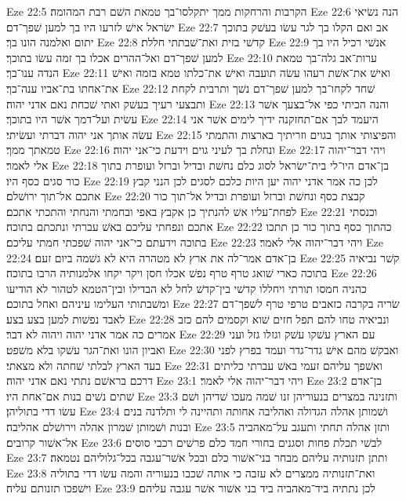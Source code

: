 Eze 22:5  הקרבות והרחקות ממך יתקלסו־בך טמאת השׁם רבת המהומה׃
Eze 22:6  הנה נשׂיאי ישׂראל אישׁ לזרעו היו בך למען שׁפך־דם׃
Eze 22:7  אב ואם הקלו בך לגר עשׂו בעשׁק בתוכך יתום ואלמנה הונו בך׃
Eze 22:8  קדשׁי בזית ואת־שׁבתתי חללת׃
Eze 22:9  אנשׁי רכיל היו בך למען שׁפך־דם ואל־ההרים אכלו בך זמה עשׂו בתוכך׃
Eze 22:10  ערות־אב גלה־בך טמאת הנדה ענו־בך׃
Eze 22:11  ואישׁ את־אשׁת רעהו עשׂה תועבה ואישׁ את־כלתו טמא בזמה ואישׁ את־אחתו בת־אביו ענה־בך׃
Eze 22:12  שׁחד לקחו־בך למען שׁפך־דם נשׁך ותרבית לקחת ותבצעי רעיך בעשׁק ואתי שׁכחת נאם אדני יהוה׃
Eze 22:13  והנה הכיתי כפי אל־בצעך אשׁר עשׂית ועל־דמך אשׁר היו בתוכך׃
Eze 22:14  היעמד לבך אם־תחזקנה ידיך לימים אשׁר אני עשׂה אותך אני יהוה דברתי ועשׂיתי׃
Eze 22:15  והפיצותי אותך בגוים וזריתיך בארצות והתמתי טמאתך ממך׃
Eze 22:16  ונחלת בך לעיני גוים וידעת כי־אני יהוה׃
Eze 22:17  ויהי דבר־יהוה אלי לאמר׃
Eze 22:18  בן־אדם היו־לי בית־ישׂראל לסוג כלם נחשׁת ובדיל וברזל ועופרת בתוך כור סגים כסף היו׃
Eze 22:19  לכן כה אמר אדני יהוה יען היות כלכם לסגים לכן הנני קבץ אתכם אל־תוך ירושׁלם׃
Eze 22:20  קבצת כסף ונחשׁת וברזל ועופרת ובדיל אל־תוך כור לפחת־עליו אשׁ להנתיך כן אקבץ באפי ובחמתי והנחתי והתכתי אתכם׃
Eze 22:21  וכנסתי אתכם ונפחתי עליכם באשׁ עברתי ונתכתם בתוכה׃
Eze 22:22  כהתוך כסף בתוך כור כן תתכו בתוכה וידעתם כי־אני יהוה שׁפכתי חמתי עליכם׃
Eze 22:23  ויהי דבר־יהוה אלי לאמר׃
Eze 22:24  בן־אדם אמר־לה את ארץ לא מטהרה היא לא גשׁמה ביום זעם׃
Eze 22:25  קשׁר נביאיה בתוכה כארי שׁואג טרף טרף נפשׁ אכלו חסן ויקר יקחו אלמנותיה הרבו בתוכה׃
Eze 22:26  כהניה חמסו תורתי ויחללו קדשׁי בין־קדשׁ לחל לא הבדילו ובין־הטמא לטהור לא הודיעו ומשׁבתותי העלימו עיניהם ואחל בתוכם׃
Eze 22:27  שׂריה בקרבה כזאבים טרפי טרף לשׁפך־דם לאבד נפשׁות למען בצע בצע׃
Eze 22:28  ונביאיה טחו להם תפל חזים שׁוא וקסמים להם כזב אמרים כה אמר אדני יהוה ויהוה לא דבר׃
Eze 22:29  עם הארץ עשׁקו עשׁק וגזלו גזל ועני ואביון הונו ואת־הגר עשׁקו בלא משׁפט׃
Eze 22:30  ואבקשׁ מהם אישׁ גדר־גדר ועמד בפרץ לפני בעד הארץ לבלתי שׁחתה ולא מצאתי׃
Eze 22:31  ואשׁפך עליהם זעמי באשׁ עברתי כליתים דרכם בראשׁם נתתי נאם אדני יהוה׃
Eze 23:1  ויהי דבר־יהוה אלי לאמר׃
Eze 23:2  בן־אדם שׁתים נשׁים בנות אם־אחת היו׃
Eze 23:3  ותזנינה במצרים בנעוריהן זנו שׁמה מעכו שׁדיהן ושׁם עשׂו דדי בתוליהן׃
Eze 23:4  ושׁמותן אהלה הגדולה ואהליבה אחותה ותהיינה לי ותלדנה בנים ובנות ושׁמותן שׁמרון אהלה וירושׁלם אהליבה׃
Eze 23:5  ותזן אהלה תחתי ותעגב על־מאהביה אל־אשׁור קרובים׃
Eze 23:6  לבשׁי תכלת פחות וסגנים בחורי חמד כלם פרשׁים רכבי סוסים׃
Eze 23:7  ותתן תזנותיה עליהם מבחר בני־אשׁור כלם ובכל אשׁר־עגבה בכל־גלוליהם נטמאה׃
Eze 23:8  ואת־תזנותיה ממצרים לא עזבה כי אותה שׁכבו בנעוריה והמה עשׂו דדי בתוליה וישׁפכו תזנותם עליה׃
Eze 23:9  לכן נתתיה ביד־מאהביה ביד בני אשׁור אשׁר עגבה עליהם׃
